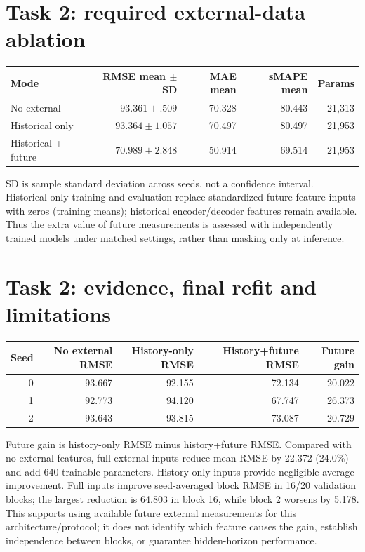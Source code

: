 \documentclass[10pt,a4paper]{article}
\begin{document}
\section*{Task 2: required external-data ablation}
\begin{center}\small
\begin{tabular}{lrrrr}\toprule
Mode & RMSE mean $\pm$ SD & MAE mean & sMAPE mean & Params\\\midrule
No external & $93.361\pm .509$ & 70.328 & 80.443 & 21,313\\
Historical only & $93.364\pm 1.057$ & 70.497 & 80.497 & 21,953\\
Historical + future & $70.989\pm 2.848$ & 50.914 & 69.514 & 21,953\\\bottomrule
\end{tabular}\end{center}
SD is sample standard deviation across seeds, not a confidence interval. Historical-only training and evaluation replace standardized future-feature inputs with zeros (training means); historical encoder/decoder features remain available. Thus the extra value of future measurements is assessed with independently trained models under matched settings, rather than masking only at inference.

\newpage
\section*{Task 2: evidence, final refit and limitations}
\begin{center}\small
\begin{tabular}{rrrrr}\toprule
Seed & No external RMSE & History-only RMSE & History+future RMSE & Future gain\\\midrule
0 & 93.667 & 92.155 & 72.134 & 20.022\\
1 & 92.773 & 94.120 & 67.747 & 26.373\\
2 & 93.643 & 93.815 & 73.087 & 20.729\\\bottomrule
\end{tabular}\end{center}
Future gain is history-only RMSE minus history+future RMSE. Compared with no external features, full external inputs reduce mean RMSE by 22.372 (24.0\%) and add 640 trainable parameters. History-only inputs provide negligible average improvement. Full inputs improve seed-averaged block RMSE in 16/20 validation blocks; the largest reduction is 64.803 in block 16, while block 2 worsens by 5.178. This supports using available future external measurements for this architecture/protocol; it does not identify which feature causes the gain, establish independence between blocks, or guarantee hidden-horizon performance.
\end{document}
